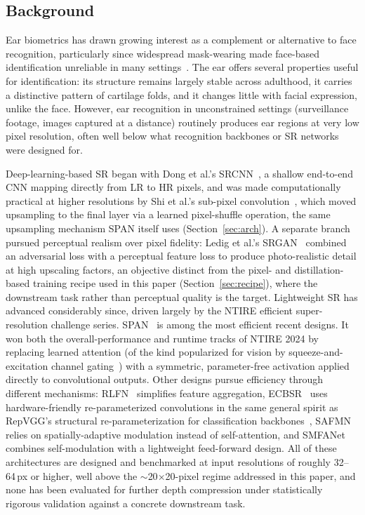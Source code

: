 \documentclass[11pt]{article}
\begin{document}
\subsection{Background}

Ear biometrics has drawn growing interest as a complement or alternative to face recognition, particularly since widespread mask-wearing made face-based identification unreliable in many settings~\cite{mehta2023ear}. The ear offers several properties useful for identification: its structure remains largely stable across adulthood, it carries a distinctive pattern of cartilage folds, and it changes little with facial expression, unlike the face. However, ear recognition in unconstrained settings (surveillance footage, images captured at a distance) routinely produces ear regions at very low pixel resolution, often well below what recognition backbones or SR networks were designed for.

Deep-learning-based SR began with Dong et al.'s SRCNN~\cite{dong2016srcnn}, a shallow end-to-end CNN mapping directly from LR to HR pixels, and was made computationally practical at higher resolutions by Shi et al.'s sub-pixel convolution~\cite{shi2016espcn}, which moved upsampling to the final layer via a learned pixel-shuffle operation, the same upsampling mechanism SPAN itself uses (Section~\ref{sec:arch}). A separate branch pursued perceptual realism over pixel fidelity: Ledig et al.'s SRGAN~\cite{ledig2017srgan} combined an adversarial loss with a perceptual feature loss to produce photo-realistic detail at high upscaling factors, an objective distinct from the pixel- and distillation-based training recipe used in this paper (Section~\ref{sec:recipe}), where the downstream task rather than perceptual quality is the target. Lightweight SR has advanced considerably since, driven largely by the NTIRE efficient super-resolution challenge series. SPAN~\cite{wan2024span} is among the most efficient recent designs. It won both the overall-performance and runtime tracks of NTIRE 2024 by replacing learned attention (of the kind popularized for vision by squeeze-and-excitation channel gating~\cite{hu2018senet}) with a symmetric, parameter-free activation applied directly to convolutional outputs. Other designs pursue efficiency through different mechanisms: RLFN~\cite{kong2022rlfn} simplifies feature aggregation, ECBSR~\cite{zhang2021ecbsr} uses hardware-friendly re-parameterized convolutions in the same general spirit as RepVGG's structural re-parameterization for classification backbones~\cite{ding2021repvgg}, SAFMN~\cite{sun2023safmn} relies on spatially-adaptive modulation instead of self-attention, and SMFANet~\cite{zheng2024smfanet} combines self-modulation with a lightweight feed-forward design. All of these architectures are designed and benchmarked at input resolutions of roughly 32--64\,px or higher, well above the $\sim$20$\times$20-pixel regime addressed in this paper, and none has been evaluated for further depth compression under statistically rigorous validation against a concrete downstream task.
\end{document}
